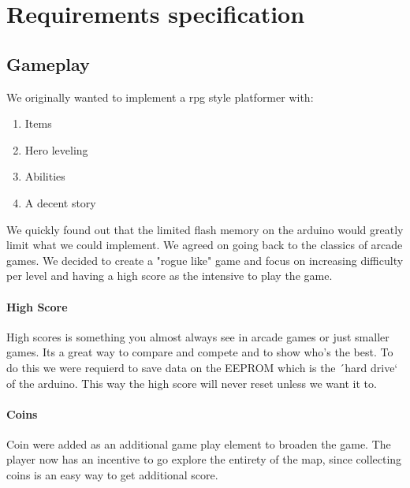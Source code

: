 \chapter{Requirements specification}

\section{Gameplay}%
We originally wanted to implement a rpg style platformer with:
\begin{enumerate}
\item Items
\item Hero leveling
\item Abilities
\item A decent story
\end{enumerate}
We quickly found out that the limited flash memory on the arduino would greatly limit what we could implement. We agreed on going back to the classics of arcade games. We decided to create a "rogue like" game and focus on increasing difficulty per level and having a high score as the intensive to play the game.

\subsubsection*{High Score}
High scores is something you almost always see in arcade games or just smaller games. Its a great way to compare and compete and to show who's the best.
To do this we were requierd to save data on the EEPROM which is the ´hard drive` of the arduino. This way the high score will never reset unless we want it to.

\subsubsection*{Coins}
Coin were added as an additional game play element to broaden the game. The player now has an incentive to go explore the entirety of the map, since collecting coins is an easy way to get additional score.
